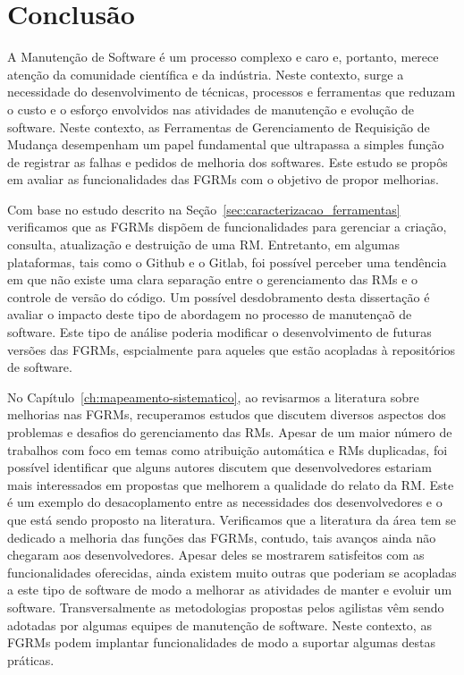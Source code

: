 \chapter{Conclusão}
\label{ch:conclusao_trab_futuros}

A Manutenção de Software é um processo complexo e caro e, portanto, merece
atenção da comunidade científica e da indústria. Neste contexto, surge a
necessidade do desenvolvimento de técnicas, processos e ferramentas que reduzam
o custo e o esforço envolvidos nas atividades de manutenção e evolução de
software. Neste contexto, as Ferramentas de Gerenciamento de Requisição de
Mudança desempenham um papel fundamental que ultrapassa a simples função de
registrar as falhas e pedidos de melhoria dos softwares. Este estudo se propôs
em avaliar as funcionalidades das FGRMs com o objetivo de propor melhorias.

Com base no estudo descrito na Seção~\ref{sec:caracterizacao_ferramentas}
verificamos que as FGRMs dispõem de funcionalidades para gerenciar a criação,
consulta, atualização e destruição de uma RM\@. Entretanto, em algumas
plataformas, tais como o Github e o Gitlab, foi possível perceber uma tendência
em que não existe uma clara separação entre o gerenciamento das RMs e o controle
de versão do código. Um possível desdobramento desta dissertação é avaliar o
impacto deste tipo de abordagem no processo de manutençaõ de software. Este tipo
de análise poderia modificar o desenvolvimento de futuras versões das FGRMs,
espcialmente para aqueles que estão acopladas à repositórios de software.

No Capítulo~\ref{ch:mapeamento-sistematico}, ao revisarmos a literatura sobre
melhorias nas FGRMs, recuperamos estudos que discutem diversos aspectos dos
problemas e desafios do gerenciamento das RMs. Apesar de um maior número de
trabalhos com foco em temas como atribuição automática e RMs duplicadas, foi
possível identificar que alguns autores discutem que desenvolvedores estariam
mais interessados em propostas que melhorem a qualidade do relato da RM\@. Este
é um exemplo do desacoplamento entre as necessidades dos desenvolvedores e o que
está sendo proposto na literatura. Verificamos que a literatura da área tem se
dedicado a melhoria das funções das FGRMs, contudo, tais avanços ainda não
chegaram aos desenvolvedores. Apesar deles se mostrarem satisfeitos com as
funcionalidades oferecidas, ainda existem muito outras que poderiam se acopladas
a este tipo de software de modo a melhorar as atividades de manter e evoluir um
software.  Transversalmente as metodologias propostas pelos agilistas vêm sendo
adotadas por algumas equipes de manutenção de software. Neste contexto, as FGRMs
podem implantar funcionalidades de modo a suportar algumas destas práticas.


